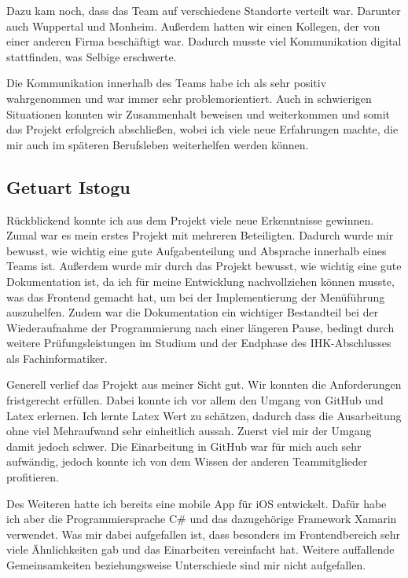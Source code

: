 Dazu kam noch, dass das Team auf verschiedene Standorte verteilt war. Darunter auch Wuppertal und Monheim. Außerdem hatten wir einen Kollegen, der von einer anderen Firma beschäftigt war. Dadurch musste viel Kommunikation digital stattfinden, was Selbige erschwerte. 

Die Kommunikation innerhalb des Teams habe ich als sehr positiv wahrgenommen und war immer sehr problemorientiert. Auch in schwierigen Situationen konnten wir Zusammenhalt beweisen und weiterkommen und somit das Projekt erfolgreich abschließen, wobei ich viele neue Erfahrungen machte, die mir auch im späteren Berufsleben weiterhelfen werden können.

\clearpage

\subsection{Getuart Istogu}
Rückblickend konnte ich aus dem Projekt viele neue Erkenntnisse gewinnen. Zumal war es mein erstes Projekt mit mehreren Beteiligten. Dadurch wurde mir bewusst, wie wichtig eine gute Aufgabenteilung und Absprache innerhalb eines Teams ist. Außerdem wurde mir durch das Projekt bewusst, wie wichtig eine gute Dokumentation ist, da ich für meine Entwicklung nachvollziehen können musste, was das Frontend gemacht hat, um bei der Implementierung der Menüführung auszuhelfen. Zudem war die Dokumentation ein wichtiger Bestandteil bei der Wiederaufnahme der Programmierung nach einer längeren Pause, bedingt durch weitere Prüfungsleistungen im Studium und der Endphase des IHK-Abschlusses als Fachinformatiker.

Generell verlief das Projekt aus meiner Sicht gut. Wir konnten die Anforderungen fristgerecht erfüllen. Dabei konnte ich vor allem den Umgang von GitHub und Latex erlernen. Ich lernte Latex Wert zu schätzen, dadurch dass die Ausarbeitung ohne viel Mehraufwand sehr einheitlich aussah. Zuerst viel mir der Umgang damit jedoch schwer. Die Einarbeitung in GitHub war für mich auch sehr aufwändig, jedoch konnte ich von dem Wissen der anderen Teammitglieder profitieren. 

Des Weiteren hatte ich bereits eine mobile App für iOS entwickelt. Dafür habe ich aber die Programmiersprache C\# und das dazugehörige Framework Xamarin verwendet. Was mir dabei aufgefallen ist, dass besonders im Frontendbereich sehr viele Ähnlichkeiten gab und das Einarbeiten vereinfacht hat. Weitere auffallende Gemeinsamkeiten beziehungsweise Unterschiede sind mir nicht aufgefallen. 

